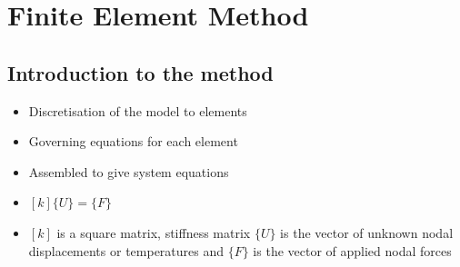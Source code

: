 \documentclass[class=report, crop=false, 12pt,a4paper]{standalone}
\begin{document}
\chapter{Finite Element Method}
\section{Introduction to the method}
\begin{itemize}
	\item Discretisation of the model to elements
	\item Governing equations for each element
	\item Assembled to give system equations
	\item $[k]\{U\} = \{F\}$
	\item $[k]$ is a square matrix, stiffness matrix $\{U\}$ is the vector of unknown nodal displacements or temperatures and $\{F\}$ is the vector of applied nodal forces
\end{itemize}
\end{document}
